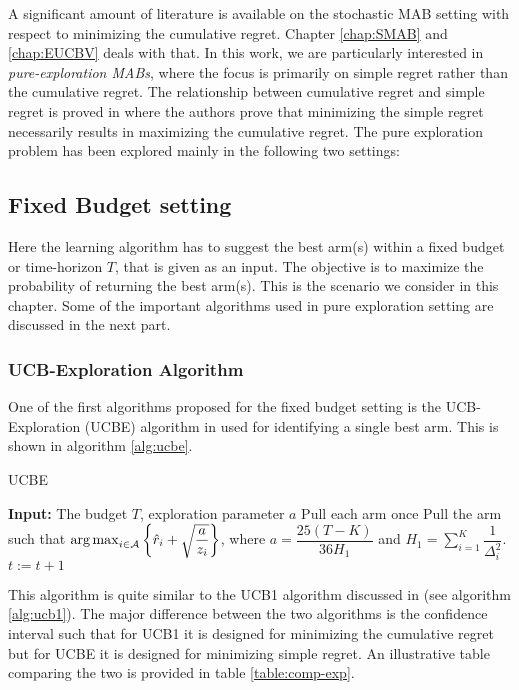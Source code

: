 A significant amount of literature is available on the stochastic MAB setting with respect to minimizing the cumulative regret. Chapter \ref{chap:SMAB} and \ref{chap:EUCBV} deals with that. In this work, we are particularly interested in \emph{pure-exploration MABs},  where the focus is primarily on simple regret rather than the cumulative regret. The relationship between cumulative regret and simple regret is proved in \citet{bubeck2011pure} where the authors prove that minimizing the simple regret necessarily results in maximizing the cumulative regret.
The pure exploration problem has been explored  mainly in the following two settings:
    
\subsection{Fixed Budget setting} 

Here the learning algorithm has to suggest the best arm(s) within a fixed budget or time-horizon $T$, that is given as an input. The objective is to maximize the probability of returning the best arm(s).  This is the scenario we consider in this chapter. Some of the important algorithms used in pure exploration setting are discussed in the next part.

\subsubsection{UCB-Exploration Algorithm}

One of the first algorithms proposed for the fixed budget setting is the UCB-Exploration (UCBE) algorithm in \citet{audibert2010best} used for identifying a single best arm. This is shown in algorithm \ref{alg:ucbe}.


\begin{algorithm}[!ht]
\caption{UCBE}
\label{alg:ucbe}
\begin{algorithmic}[1]
\State \textbf{Input: } The budget $T$, exploration parameter $a$
\State Pull each arm once
\State Pull the arm such that $\operatorname*{arg\,max}_{i\in \mathcal{A}}\bigg\lbrace\hat{r}_{i} + \sqrt{\dfrac{a}{z_i}}\bigg\rbrace$, where $a = \dfrac{25(T-K)}{36 H_1}$ and $H_1 = \sum_{i=1}^{K}\dfrac{1}{\Delta_i^2}$.
\State $t:=t+1 $
\EndFor
\end{algorithmic}
\end{algorithm}

This algorithm is quite similar to the UCB1 algorithm discussed in \citet{auer2002finite} (see algorithm \ref{alg:ucb1}). The major difference between the two algorithms is the confidence interval such that for UCB1 it is designed for minimizing the cumulative regret but for UCBE it is designed for minimizing simple regret. An illustrative table comparing the two is provided in table \ref{table:comp-exp}.

